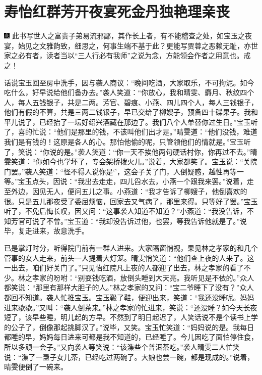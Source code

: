 

\chapter{寿怡红群芳开夜宴\hspace{.5em}死金丹独艳理亲丧}

{\includegraphics[width=3mm]{../Images/00005} \kaishu 此书写世人之富贵子弟易流邪鄙，其作长上者，有不能稽查之处，如宝玉之夜宴，始见之文雅韵致，细思之，何事生端不基于此？更能写贾蓉之恶赖无耻，亦世家之必有者，读者当以``三人行必有我师''之说为念，方能领会作者之用意也。戒之！}

话说宝玉回至房中洗手，因与袭人商议：``晚间吃酒，大家取乐，不可拘泥。如今吃什么，好早说给他们备办去。''袭人笑道：``你放心，我和晴雯、麝月、秋纹四个人，每人五钱银子，共是二两。芳官、碧痕、小燕、四儿四个人，每人三钱银子，他们有假的不算，共是三两二钱银子，早已交给了柳嫂子，预备四十碟果子。我和平儿说了，已经抬了一坛好绍兴酒藏在那边了。我们八个人单替你过生日。''宝玉听了，喜的忙说：``他们是那里的钱，不该叫他们出才是。''晴雯道：``他们没钱，难道我们是有钱的！这原是各人的心。那怕他偷的呢，只管领他们的情就是。''宝玉听了，笑说：``你说的是。''袭人笑道：``你一天不挨他两句硬话村你，你再过不去。''晴雯笑道：``你如今也学坏了，专会架桥拨火儿。''说着，大家都笑了。宝玉说：``关院门罢。''袭人笑道：``怪不得人说你是`'，这会子关了门，人倒疑惑，越性再等一等。''宝玉点头，因说：``我出去走走，四儿舀水去，小燕一个跟我来罢。''说着，走至外边，因见无人，便问五儿之事。小燕道：``我才告诉了柳嫂子，他倒喜欢的很。只是五儿那夜受了委屈烦恼，回家去又气病了，那里来得。只等好了罢。''宝玉听了，不免后悔长叹，因又问：``这事袭人知道不知道？''小燕道：``我没告诉，不知芳官可说了不曾。''宝玉道：``我却没告诉过他，也罢，等我告诉他就是了。''说毕，复走进来，故意洗手。

已是掌灯时分，听得院门前有一群人进来。大家隔窗悄视，果见林之孝家的和几个管事的女人走来，前头一人提着大灯笼。晴雯悄笑道：``他们查上夜的人来了。这一出去，咱们好关门了。''只见怡红院凡上夜的人都迎了出去，林之孝家的看了不少。林之孝家的吩咐：``别耍钱吃酒，放倒头睡到大天亮。我听见是不依的。''众人都笑说：``那里有那样大胆子的人。''林之孝家的又问：``宝二爷睡下了没有？''众人都回不知道。袭人忙推宝玉。宝玉靸了鞋，便迎出来，笑道：``我还没睡呢。妈妈进来歇歇。''又叫：``袭人倒茶来。''林之孝家的忙进来，笑说：``还没睡？如今天长夜短了，该早些睡，明儿起的方早。不然到了明日起迟了，人笑话说不是个读书上学的公子了，倒像那起挑脚汉了。''说毕，又笑。宝玉忙笑道：``妈妈说的是。我每日都睡的早，妈妈每日进来可都是我不知道的，已经睡了。今儿因吃了面怕停住食，所以多顽一会子。''又向袭人等笑说：``该潗些个普洱茶吃。''袭人晴雯二人忙笑说：``潗了一盄子女儿茶，已经吃过两碗了。大娘也尝一碗，都是现成的。''说着，晴雯便倒了一碗来。

